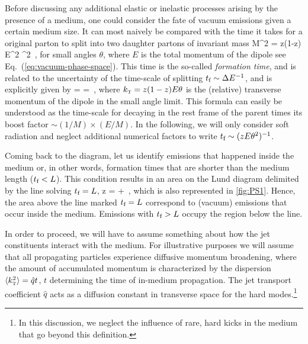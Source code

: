 Before discussing any additional elastic or inelastic processes arising by the presence of a medium, one could consider the fate of vacuum emissions given a certain medium size. It can most naively be compared with the time it takes for a original parton to split into two daughter partons of invariant mass 
\beq
\label{eq:DipoleMass}
M^2 = z(1-z) E^2 \theta^2 \,,
\eeq
for small angles $\theta$, where $E$ is the total momentum of the dipole
see Eq.~(\ref{eq:vacuum-phase-space}). This time is the so-called \textsl{formation time}, and is related to the uncertainty of the time-scale of splitting $t_\text{f} \sim \Delta E^{-1}$, and is explicitly given by
\beq
\label{eq:FormationTime}
\tform =  =  \,,
\eeq
where 
$k_{\text{\tiny T}} = z(1-z) E \theta$ is the (relative) transverse momentum of the dipole in the small angle limit. 
This formula can easily be understood as the time-scale for decaying in the rest frame of the parent times its boost factor $\sim (1/M) \times (E/M)$. In the following, we will only consider soft radiation and neglect additional numerical factors to write $t_\text{f} \sim (z E \theta^2)^{-1} $.

Coming back to the diagram, let us identify emissions that happened inside the medium or, in other words, formation times that are shorter than the medium length ($t_\text{f} < L$). 
This condition results in an area on the Lund diagram delimited by the line solving $t_\text{f} = L$,
\beq
\log z \theta = \log {} + \log {} \,,
\eeq
which is also represented in \autoref{fig:PS1}. Hence, the area above the line marked $t_\text{f} = L$ correspond to (vacuum) emissions that occur inside the medium. Emissions with $t_\text{f} > L$ occupy the region below the line.

In order to proceed, we will have to assume something about how the jet constituents interact with the medium. For illustrative purposes we will assume that all propagating particles experience diffusive momentum broadening, where the amount of accumulated momentum is characterized by the dispersion $\langle k_{\text{\tiny T}}^2 \rangle = \hat q t$, $t$ determining the time of in-medium propagation. The jet transport coefficient $\hat q$ acts as a diffusion constant in transverse space for the hard modes.\footnote{In this discussion, we neglect the influence of rare, hard kicks in the medium that go beyond this definition.} 

